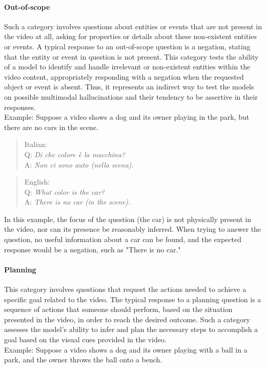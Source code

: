 \paragraph{{\textbf{Out-of-scope}}}
Such a category involves questions about entities or events that are not present in the video at all, asking for properties or details about these non-existent entities or events. A typical response to an out-of-scope question is a negation, stating that the entity or event in question is not present. This category tests the ability of a model to identify and handle irrelevant or non-existent entities within the video content, appropriately responding with a negation when the requested object or event is absent. Thus, it represents an indirect way to test the models on possible multimodal hallucinations and their tendency to be assertive in their responses.\\
Example: Suppose a video shows a dog and its owner playing in the park, but there are no cars in the scene.
\begin{quote}
        Italian:\\
Q: \textit{Di che colore è la macchina?}\\
A: \textit{Non ci sono auto (nella scena).}\\

    \end{quote}
\begin{quote}
        English:\\
Q: \textit{What color is the car?}\\
A: \textit{There is no car (in the scene).}\\

    \end{quote}
In this example, the focus of the question (the car) is not physically present in the video, nor can its presence be reasonably inferred. When trying to answer the question, no useful information about a car can be found, and the expected response would be a negation, such as "There is no car."



\paragraph{{\textbf{Planning}}}
This category involves questions that request the actions needed to achieve a specific goal related to the video. The typical response to a planning question is a sequence of actions that someone should perform, based on the situation presented in the video, in order to reach the desired outcome. Such a category assesses the model's ability to infer and plan the necessary steps to accomplish a goal based on the visual cues provided in the video.\\
Example: Suppose a video shows a dog and its owner playing with a ball in a park, and the owner throws the ball onto a bench.

